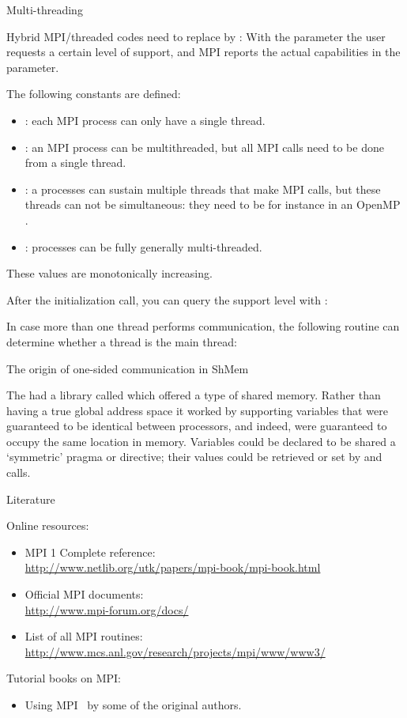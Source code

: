 
 {Multi-threading}
\label{sec:ref:mpi-thread}

Hybrid MPI/threaded codes need to replace 
by :
%
%
With the  parameter the user requests a certain level of support,
and MPI reports the actual capabilities in the  parameter.

The following constants are defined:
\begin{itemize}
\item {}: each MPI process can only have
  a single thread.
\item {}: an MPI process can be
  multithreaded, but all MPI calls need to be done from a single
  thread.
\item {}: a processes can sustain
  multiple threads that make MPI calls, but these threads can not be
  simultaneous: they need to be for instance in an OpenMP
  .
\item {}: processes can be fully
  generally multi-threaded.
\end{itemize}
These values are monotonically increasing.

After the initialization call, you can query the support level
with :
%

In case more than one thread performs communication, the following routine
can determine whether a thread is the main thread:
%

 {The origin of one-sided communication in ShMem}

The  had a library called 
which offered a type of shared memory. Rather than having a true
global address space it worked by supporting variables that were
guaranteed to be identical between processors, and indeed, were
guaranteed to occupy the same location in memory. Variables could be
declared to be shared a `symmetric' pragma or directive; their values
could be retrieved or set by  and  calls.

 {Literature}

Online resources:
\begin{itemize}
\item MPI 1 Complete reference:\\ \url{http://www.netlib.org/utk/papers/mpi-book/mpi-book.html}
\item Official MPI documents:\\ \url{http://www.mpi-forum.org/docs/}
\item List of all MPI routines:\\ \url{http://www.mcs.anl.gov/research/projects/mpi/www/www3/}
\end{itemize}

Tutorial books on MPI:
\begin{itemize}
\item Using MPI~\cite{Gropp:UsingMPI1} by some of the original authors.
\end{itemize}

\endinput

Examples: 
compute pi
mandelbrot set
